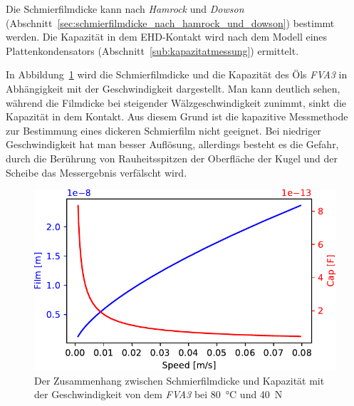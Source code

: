 Die Schmierfilmdicke kann nach \textit{Hamrock} und \textit{Dowson} (Abschnitt~\ref{sec:schmierfilmdicke_nach_hamrock_und_dowson}) bestimmt werden.
Die Kapazität in dem EHD-Kontakt wird nach dem Modell eines Plattenkondensators (Abschnitt~\ref{sub:kapazitatmessung}) ermittelt.

In Abbildung~\ref{fig:filmdicke_kapazitaet_geschwindigkeit} wird die Schmierfilmdicke und die Kapazität des Öls \textit{FVA3} in Abhängigkeit mit der Geschwindigkeit dargestellt.
Man kann deutlich sehen, während die Filmdicke bei steigender Wälzgeschwindigkeit zunimmt, sinkt die Kapazität in dem Kontakt.
Aus diesem Grund ist die kapazitive Messmethode zur Bestimmung eines dickeren Schmierfilm nicht geeignet.
Bei niedriger Geschwindigkeit hat man besser Auflösung, allerdings besteht es die Gefahr, durch die Berührung von Rauheitsspitzen der Oberfläche der Kugel und der Scheibe das Messergebnis verfälscht wird.
\begin{figure}[htb]
    \centering
    \includegraphics[]{./images/film_cap_speed_80C_40N_fva3.pdf}
    \caption{Der Zusammenhang zwischen Schmierfilmdicke und Kapazität mit der Geschwindigkeit von dem \textit{FVA3} bei \SI{80}{\degreeCelsius} und \SI{40}{\N}}
    \label{fig:filmdicke_kapazitaet_geschwindigkeit}
\end{figure}

